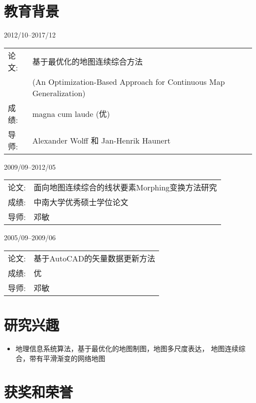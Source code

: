 \documentclass{resume}
\begin{document}
\section{教育背景}
{2012/10--2017/12}
\begin{tabular}{ll}			
	论文:  & 基于最优化的地图连续综合方法 \\
           & (An Optimization-Based Approach for Continuous Map Generalization)\footnotemark\\
	成绩:      & magna cum laude (优)\\
	导师:      & Alexander Wolff 和 Jan-Henrik Haunert
\end{tabular}%
%
{2009/09--2012/05}
\begin{tabular}{ll}	
	论文:  & 面向地图连续综合的线状要素Morphing变换方法研究\footnotemark\\
	成绩:      & 中南大学优秀硕士学位论文\\
	导师:      & 邓敏
\end{tabular}
%
{2005/09--2009/06}
\begin{tabular}{ll}	
	论文:  & 基于AutoCAD的矢量数据更新方法\\
	成绩:      & 优\\
	导师:      & 邓敏
\end{tabular}



\section{研究兴趣}
\begin{itemize}[parsep=0ex]
\item 地理信息系统算法，基于最优化的地图制图，地图多尺度表达， 
    地图连续综合，带有平滑渐变的网络地图
\end{itemize}

\section{获奖和荣誉}
\begin{itemize}[parsep=0ex]
\end{itemize}
\end{document}
